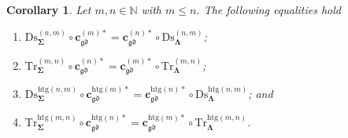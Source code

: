 \documentclass[a4paper, reqno]{amsbook}
\newcommand{\sig}[1]{\mathbf{#1}}             %
\newcommand{\gd}{\mathfrak{gd}}              %
\newcommand{\htg}{\mathrm{htg}}                %
\newcommand{\Ds}{\mathrm{Ds}}
\newcommand{\Tr}{\mathrm{Tr}}
\theoremstyle{plain}
\newtheorem{corollary}[theorem]{Corollary}
\theoremstyle{definition}
\begin{document}
\begin{corollary}\label{CChangeSigDsTr}
Let $m,n\in\mathbb{N}$ with $m\leq n$.
The following equalities hold
\begin{enumerate}
	\item
	$\Ds^{(n,m)}_{\sig{\Sigma}}\circ\mathbf{c}^{(m)\ast}_{\gd}=\mathbf{c}^{(n)\ast}_{\gd}\circ\Ds^{(n,m)}_{\sig{\Lambda}}$;

	\item
	$\Tr^{(m,n)}_{\sig{\Sigma}}\circ\mathbf{c}^{(n)\ast}_{\gd}=\mathbf{c}^{(m)\ast}_{\gd}\circ\Tr^{(m,n)}_{\sig{\Lambda}}$;

	\item
	$\Ds^{\htg(n,m)}_{\sig{\Sigma}}\circ\mathbf{c}^{\htg(m)\ast}_{\gd}=\mathbf{c}^{\htg(n)\ast}_{\gd}\circ\Ds^{\htg(n,m)}_{\sig{\Lambda}}$; and

	\item
	$\Tr^{\htg(m,n)}_{\sig{\Sigma}}\circ\mathbf{c}^{\htg(n)\ast}_{\gd}=\mathbf{c}^{\htg(m)\ast}_{\gd}\circ\Tr^{\htg(m,n)}_{\sig{\Lambda}}$.
\end{enumerate}
\end{corollary}
\end{document}
